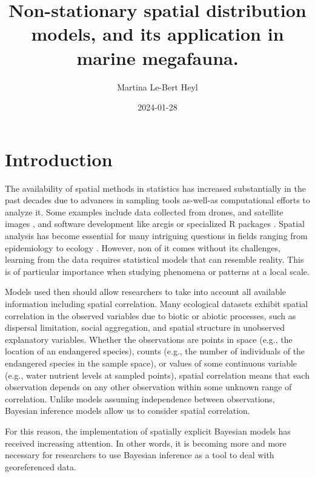 \documentclass[
]{book}
\title{Non-stationary spatial distribution models, and its application in marine megafauna.}
\author{Martina Le-Bert Heyl}
\date{2024-01-28}
\begin{document}
\maketitle

{
\setcounter{tocdepth}{1}
\tableofcontents
}
\hypertarget{introduction}{%
\chapter*{Introduction}\label{introduction}}

The availability of spatial methods in statistics has increased substantially in the past decades due to advances in sampling tools as-well-as computational efforts to analyze it. Some examples include data collected from drones, and satellite images \citep{perry_illustrations_2002, pettorelli_satellite_2014}, and software development like arcgis \citep{scott_spatial_2010} or specialized R packages \citep{r-core_comprehensive_2000}. Spatial analysis has become essential for many intriguing questions in fields ranging from epidemiology to ecology \citep{fortin_spatial_2006, fotheringham_local_1999, moraga_spatial_2023}. However, non of it comes without its challenges, learning from the data requires statistical models that can resemble reality. This is of particular importance when studying phenomena or patterns at a local scale.

Models used then should allow researchers to take into account all available information including spatial correlation. Many ecological datasets exhibit spatial correlation in the observed variables due to biotic or abiotic processes, such as dispersal limitation, social aggregation, and spatial structure in unobserved explanatory variables. Whether the observations are points in space (e.g., the location of an endangered species), counts (e.g., the number of individuals of the endangered species in the sample space), or values of some continuous variable (e.g., water nutrient levels at sampled points), spatial correlation means that each observation depends on any other observation within some unknown range of correlation. Unlike models assuming independence between observations, Bayesian inference models allow us to consider spatial correlation.

For this reason, the implementation of spatially explicit Bayesian models has received increasing attention. In other words, it is becoming more and more necessary for researchers to use Bayesian inference as a tool to deal with georeferenced data.
\end{document}
